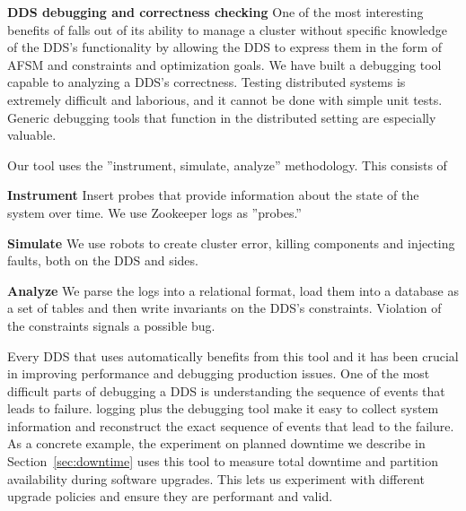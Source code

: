 \textbf{DDS debugging and correctness checking}
%
One of the most interesting benefits of \helix falls out of its ability to
manage a cluster without specific knowledge of the DDS's
functionality by allowing the DDS
to express them in the form of AFSM and constraints and optimization goals. We
have built a debugging tool capable to analyzing a DDS's correctness.
Testing distributed systems is extremely difficult and laborious, and it cannot
be done with simple unit tests.   Generic
debugging tools that function in the distributed setting are especially valuable.  

Our tool uses the ''instrument,
simulate, analyze'' methodology. This consists of
\squishlist
\item \textbf{Instrument} Insert probes that provide information about the state of the system
over time.  We use Zookeeper logs as ''probes.''
\item \textbf{Simulate} We use robots to create cluster error, killing
components and injecting faults, both on the DDS and \helix sides.
\item \textbf{Analyze} We parse the logs into a relational format, load them into a database as
a set of tables and then write invariants on the DDS's constraints.  Violation
of the constraints signals a possible bug.
\squishend

Every DDS that uses \helix automatically benefits from this tool and it has been crucial
in improving performance and debugging production issues.  
One of the most difficult parts of debugging a DDS is understanding the sequence
of events that leads to failure.  \helix logging plus the debugging tool make it
easy to collect system information and reconstruct the exact sequence of
events that lead to the failure.
As a concrete example, the experiment on
planned downtime we describe in Section~\ref{sec:downtime} uses this tool to
measure total downtime and partition availability during software upgrades.
This lets us experiment with different upgrade policies and ensure they are
performant and valid.



